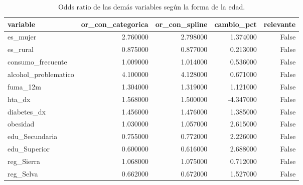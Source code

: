 \begin{table}[htbp]
\caption{Odds ratio de las demás variables según la forma de la edad.}
\label{tab:tabla_56_edad_efecto_sobre_las_demas}
\begin{tabular}{lrrrr}
\toprule
variable & or\_con\_categorica & or\_con\_spline & cambio\_pct & relevante \\
\midrule
es\_mujer & 2.760000 & 2.798000 & 1.374000 & False \\
es\_rural & 0.875000 & 0.877000 & 0.213000 & False \\
consumo\_frecuente & 1.009000 & 1.014000 & 0.536000 & False \\
alcohol\_problematico & 4.100000 & 4.128000 & 0.671000 & False \\
fuma\_12m & 1.304000 & 1.319000 & 1.121000 & False \\
hta\_dx & 1.568000 & 1.500000 & -4.347000 & False \\
diabetes\_dx & 1.456000 & 1.476000 & 1.385000 & False \\
obesidad & 1.030000 & 1.057000 & 2.615000 & False \\
edu\_Secundaria & 0.755000 & 0.772000 & 2.226000 & False \\
edu\_Superior & 0.600000 & 0.616000 & 2.688000 & False \\
reg\_Sierra & 1.068000 & 1.075000 & 0.712000 & False \\
reg\_Selva & 0.662000 & 0.672000 & 1.527000 & False \\
\bottomrule
\end{tabular}
\end{table}

